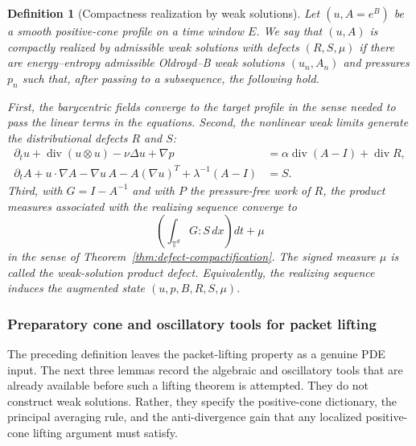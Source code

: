 \documentclass[11pt]{article}
\numberwithin{equation}{section}
\newtheorem{definition}[theorem]{Definition}
\newcommand{\T}{\mathbb T}
\newcommand{\Id}{I}
\newcommand{\divv}{\operatorname{div}}
\begin{document}
\begin{definition}[Compactness realization by weak solutions]
\label{def:weak-compactness-realization}
Let \((u,A=e^B)\) be a smooth positive-cone profile on a time window \(E\).
We say that \((u,A)\) is compactly realized by admissible weak solutions with
defects \((R,S,\mu)\) if there are energy--entropy admissible Oldroyd--B weak
solutions \((u_n,A_n)\) and pressures \(p_n\) such that, after passing to a
subsequence, the following hold.

First, the barycentric fields converge to the target profile in the sense
needed to pass the linear terms in the equations.  Second, the nonlinear weak
limits generate the distributional defects \(R\) and \(S\):
\begin{align}
  \partial_t u+\divv(u\otimes u)-\nu\Delta u+\nabla p
  &=
  \alpha\divv(A-\Id)+\divv R,
  \label{eq:weak-compactness-momentum}\\
  \partial_t A+u\cdot\nabla A-\nabla u\,A-A(\nabla u)^T
  +\lambda^{-1}(A-\Id)
  &=
  S.
  \label{eq:weak-compactness-conformation}
\end{align}
Third, with \(G=\Id-A^{-1}\) and with \(P\) the pressure-free work of \(R\),
the product measures associated with the realizing sequence converge to
\[
  \left(\int_{\T^d}G:S\,dx\right)dt+\mu
\]
in the sense of Theorem~\ref{thm:defect-compactification}.  The signed measure
\(\mu\) is called the weak-solution product defect.  Equivalently, the realizing
sequence induces the augmented state \((u,p,B,R,S,\mu)\).
\end{definition}

\subsubsection{Preparatory cone and oscillatory tools for packet lifting}
\label{subsec:packet-tools}

The preceding definition leaves the packet-lifting property as a genuine PDE
input.  The next three lemmas record the algebraic and oscillatory tools that
are already available before such a lifting theorem is attempted.  They do not
construct weak solutions.  Rather, they specify the positive-cone dictionary,
the principal averaging rule, and the anti-divergence gain that any localized
positive-cone lifting argument must satisfy.
\end{document}
